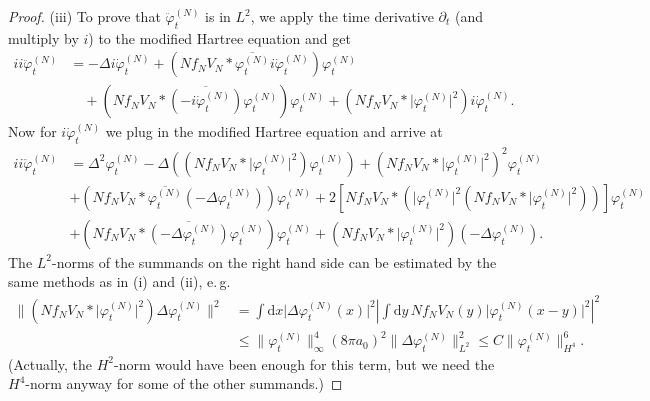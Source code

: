\documentclass[11pt,a4paper]{scrartcl}
\newcommand{\di}{\textrm{d}}		%
\newcommand{\cc}[1]{\overline{#1}}	%
\newcommand{\norm}[1]{\lVert#1\rVert}	%
\newcommand{\ph}{\varphi_t^{(N)}}	%
\newcommand{\phdot}{\dot{\varphi}_t^{(N)}}	%
\newcommand{\phddot}{\ddot{\varphi}_t^{(N)}}	%
\begin{document}
\begin{proof}
(iii) To prove that $\phddot$ is in $L^2$, we apply the time derivative $\partial_t$ (and multiply by $i$) to the modified Hartree equation and get
\begin{align*}
ii\phddot & = - \Delta i \phdot + \left( N f_N V_N \ast \cc{\ph}i \phdot \right) \ph \\
& \quad + \left( N f_N V_N \ast \cc{(-i\phdot)} \ph \right) \ph + \left( N f_N V_N \ast \lvert\ph\rvert^2 \right) i\phdot.
\end{align*}
Now for $i\phdot$ we plug in the modified Hartree equation and arrive at
\begin{align*}
ii \phddot & = \Delta^2 \ph - \Delta \left( (N f_N V_N \ast \lvert \ph\rvert^2)\ph \right) + \left( N f_N V_N \ast \lvert \ph\rvert^2 \right)^2 \ph \\
& + (N f_N V_N \ast \cc{\ph}(-\Delta \ph))\ph + 2 \left[ N f_N V_N \ast \left( \lvert \ph\rvert^2 (N f_N V_N \ast \lvert \ph\rvert^2) \right) \right] \ph \\
& + (N f_N V_N \ast \cc{(-\Delta \ph)} \ph)\ph + \left( N f_N V_N \ast \lvert \ph \rvert^2 \right)(-\Delta \ph).
\end{align*}
The $L^2$-norms of the summands on the right hand side can be estimated by the same methods as in (i) and (ii), e.\,g.\ 
\begin{align*}
 \norm{\left( N f_N V_N \ast \lvert \ph\rvert^2 \right) \Delta \ph}^2 & = \int \di x \lvert \Delta \ph(x)\rvert^2 \left\lvert \int \di y\, N f_N V_N(y) \lvert \ph(x-y) \rvert^2 \right\rvert^2 \\
& \leq \norm{\ph}_\infty^4 (8 \pi a_0)^2 \norm{\Delta \ph}_{L^2}^2 \leq C \norm{\ph}_{H^4}^6.
\end{align*}
(Actually, the $H^2$-norm would have been enough for this term, but we need the $H^4$-norm anyway for some of the other summands.)
\end{proof}
\end{document}
